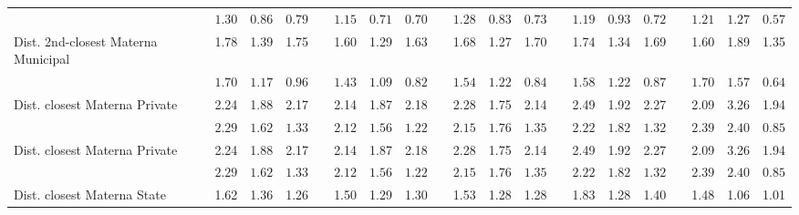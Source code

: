 \begin{center}
{\begin{longtable}{L{5cm} c c c p{.5cm} c c c p{.5cm} c c c p{.5cm} c c c p{.5cm} c c c}
& $\mathit{     1.30}$ & $\mathit{     0.86}$ & $\mathit{     0.79}$ & & $\mathit{     1.15}$ & $\mathit{     0.71}$ & $\mathit{     0.70}$ & & $\mathit{     1.28}$ & $\mathit{     0.83}$ & $\mathit{     0.73}$ & & $\mathit{     1.19}$ & $\mathit{     0.93}$ & $\mathit{     0.72}$ & & $\mathit{     1.21}$ & $\mathit{     1.27}$ & $\mathit{     0.57}$ \\[.7em]
Dist. 2nd-closest Materna Municipal & 1.78 &      1.39 &      1.75 & &      1.60 &      1.29 &      1.63 & &      1.68 &      1.27 &      1.70 & &      1.74 &      1.34 &      1.69 & &      1.60 &      1.89 &      1.35 \\*
& $\mathit{     1.70}$ & $\mathit{     1.17}$ & $\mathit{     0.96}$ & & $\mathit{     1.43}$ & $\mathit{     1.09}$ & $\mathit{     0.82}$ & & $\mathit{     1.54}$ & $\mathit{     1.22}$ & $\mathit{     0.84}$ & & $\mathit{     1.58}$ & $\mathit{     1.22}$ & $\mathit{     0.87}$ & & $\mathit{     1.70}$ & $\mathit{     1.57}$ & $\mathit{     0.64}$ \\[.7em]
Dist. closest Materna Private & 2.24 &      1.88 &      2.17 & &      2.14 &      1.87 &      2.18 & &      2.28 &      1.75 &      2.14 & &      2.49 &      1.92 &      2.27 & &      2.09 &      3.26 &      1.94 \\*
& $\mathit{     2.29}$ & $\mathit{     1.62}$ & $\mathit{     1.33}$ & & $\mathit{     2.12}$ & $\mathit{     1.56}$ & $\mathit{     1.22}$ & & $\mathit{     2.15}$ & $\mathit{     1.76}$ & $\mathit{     1.35}$ & & $\mathit{     2.22}$ & $\mathit{     1.82}$ & $\mathit{     1.32}$ & & $\mathit{     2.39}$ & $\mathit{     2.40}$ & $\mathit{     0.85}$ \\[.7em]
Dist. closest Materna Private & 2.24 &      1.88 &      2.17 & &      2.14 &      1.87 &      2.18 & &      2.28 &      1.75 &      2.14 & &      2.49 &      1.92 &      2.27 & &      2.09 &      3.26 &      1.94 \\*
& $\mathit{     2.29}$ & $\mathit{     1.62}$ & $\mathit{     1.33}$ & & $\mathit{     2.12}$ & $\mathit{     1.56}$ & $\mathit{     1.22}$ & & $\mathit{     2.15}$ & $\mathit{     1.76}$ & $\mathit{     1.35}$ & & $\mathit{     2.22}$ & $\mathit{     1.82}$ & $\mathit{     1.32}$ & & $\mathit{     2.39}$ & $\mathit{     2.40}$ & $\mathit{     0.85}$ \\[.7em]
Dist. closest Materna State & 1.62 &      1.36 &      1.26 & &      1.50 &      1.29 &      1.30 & &      1.53 &      1.28 &      1.28 & &      1.83 &      1.28 &      1.40 & &      1.48 &      1.06 &      1.01 \\*

\end{longtable}}
\end{center}
